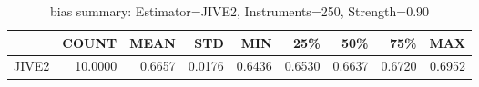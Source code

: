 \begin{table}[ht]
\centering
\caption{bias summary: Estimator=JIVE2, Instruments=250, Strength=0.90}
\begin{tabular}{lrrrrrrrr}
\toprule
 & COUNT & MEAN & STD & MIN & 25\% & 50\% & 75\% & MAX \\
\midrule
JIVE2 & 10.0000 & 0.6657 & 0.0176 & 0.6436 & 0.6530 & 0.6637 & 0.6720 & 0.6952 \\
\bottomrule
\end{tabular}
\end{table}
